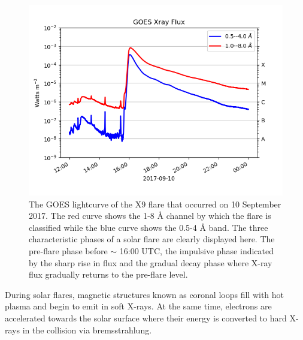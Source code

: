 \begin{figure}[ht]
    \centering
    \includegraphics[width=\columnwidth]{Images/GOES_Xclass.png}
    \caption[GOES lightcurve for X9 class flare on 10 September 2017.]{The GOES lightcurve of the X9 flare that occurred on 10 September 2017. The red curve shows the 1-8 {\AA} channel by which the flare is classified while the blue curve shows the 0.5-4 {\AA} band. The three characteristic phases of a solar flare are clearly displayed here. The pre-flare phase before $\sim$ 16:00 UTC, the impulsive phase indicated by the sharp rise in flux and the gradual decay phase where X-ray flux gradually returns to the pre-flare level.}
    \label{fig:GOES_Xclass}
\end{figure}
During solar flares, magnetic structures known as coronal loops fill with hot plasma and begin to emit in soft X-rays. At the same time, electrons are accelerated towards the solar surface where their energy is converted to hard X-rays in the collision via bremsstrahlung. 

